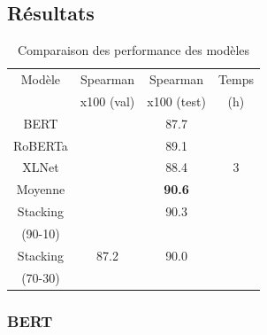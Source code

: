 \documentclass[11pt,a4paper, french]{article}
\begin{document}

\subsection{Résultats}



\begin{table}[h!]
\centering
\begin{tabular}{|c| c c c|}
 \hline
 Modèle & Spearman & Spearman & Temps \\[0.5ex]
 & x100 (val) & x100 (test) & (h) \\
 \hline\hline
 BERT     &  & 87.7 &  \\
 \hline
 RoBERTa  &  & 89.1 &  \\
 \hline
 XLNet    &  & 88.4 & 3 \\
 \hline
 Moyenne  &  & \textbf{90.6} &  \\
 \hline
 Stacking &  & 90.3 &  \\
 (90-10)  & & & \\
 \hline
 Stacking & 87.2 & 90.0 &  \\
 (70-30)  &  & & \\
 \hline
 \hline
\end{tabular}
\caption{Comparaison des performance des modèles}
\label{table:models:results}
\end{table}
%
\subsubsection{BERT}
\end{document}
